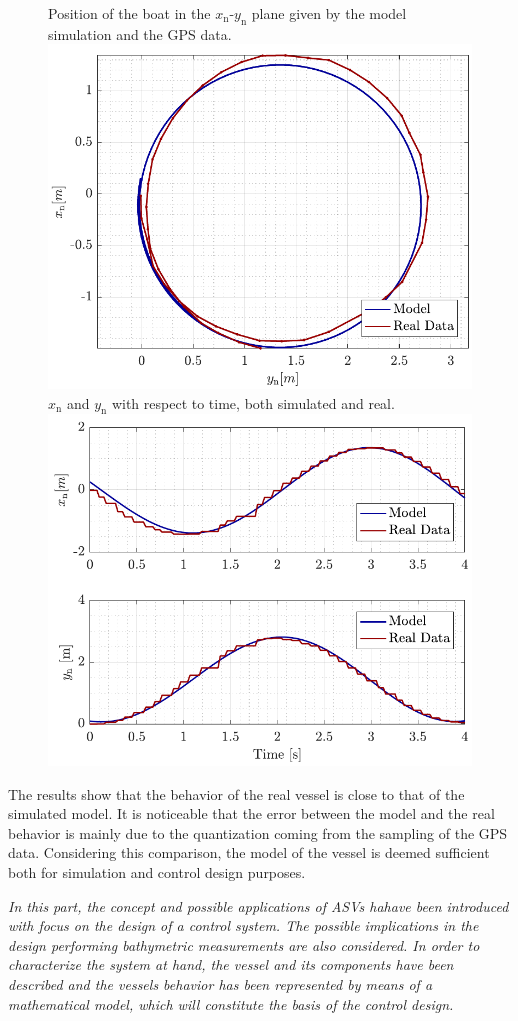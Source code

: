 \begin{figure}[H]
    \captionbox 
    {   
        Position of the boat in the $x_\mathrm{n}$-$y_\mathrm{n}$ plane given by the model simulation and the GPS data.
        \label{fig:turn}
    }                                                                 
    {                                                                  
        \includegraphics[width=.45\textwidth]{figures/turn}         
    }                                                                    
    \hspace{5pt}                                                          
    \captionbox  
    {      
        $x_\mathrm{n}$ and $y_\mathrm{n}$ with respect to time, both simulated and real.
        \label{fig:turn_time}
    }                                                                        
    {
        \includegraphics[width=.45\textwidth]{figures/turn_time}
    }
\end{figure}

The results show that the behavior of the real vessel is close to that of the simulated model. It is noticeable that the error between the model and the real behavior is mainly due to the quantization coming from the sampling of the GPS data. Considering this comparison, the model of the vessel is deemed sufficient both for simulation and control design purposes. 

\textit{In this part, the concept and possible applications of ASVs hahave been introduced with focus on the design of a control system. The possible implications in the design  performing bathymetric measurements are also considered. In order to characterize the system at hand, the vessel and its components have been described and the vessels behavior has been represented by means of a mathematical model, which will constitute the basis of the control design.}


